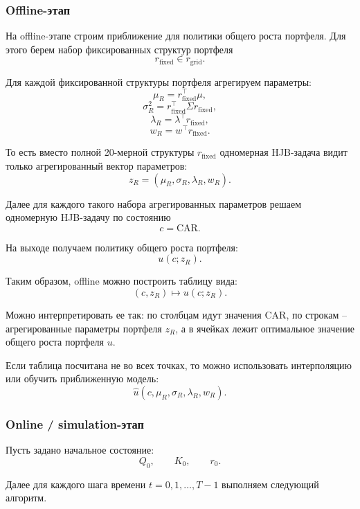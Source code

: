 \documentclass[12pt,a4paper]{article}
\begin{document}
\subsubsection*{Offline-этап}

На offline-этапе строим приближение для политики общего роста портфеля. Для этого берем набор фиксированных структур портфеля
\[
    r_{\mathrm{fixed}} \in r_{\mathrm{grid}}.
\]

Для каждой фиксированной структуры портфеля агрегируем параметры:
\[
    \mu_R = r_{\mathrm{fixed}}^\top \mu,
\]
\[
    \sigma_R^2 = r_{\mathrm{fixed}}^\top \Sigma r_{\mathrm{fixed}},
\]
\[
    \lambda_R = \lambda^\top r_{\mathrm{fixed}},
\]
\[
    w_R = w^\top r_{\mathrm{fixed}}.
\]

То есть вместо полной 20-мерной структуры $r_{\mathrm{fixed}}$ одномерная HJB-задача видит только агрегированный вектор параметров:
\[
    z_R =
    (\mu_R,\sigma_R,\lambda_R,w_R).
\]

Далее для каждого такого набора агрегированных параметров решаем одномерную HJB-задачу по состоянию
\[
    c = \mathrm{CAR}.
\]

На выходе получаем политику общего роста портфеля:
\[
    u(c; z_R).
\]

Таким образом, offline можно построить таблицу вида:
\[
    (c,z_R) \mapsto u(c;z_R).
\]

Можно интерпретировать ее так: по столбцам идут значения CAR, по строкам -- агрегированные параметры портфеля $z_R$, а в ячейках лежит оптимальное значение общего роста портфеля $u$.

Если таблица посчитана не во всех точках, то можно использовать интерполяцию или обучить приближенную модель:
\[
    \widehat u(c,\mu_R,\sigma_R,\lambda_R,w_R).
\]

\subsubsection*{Online / simulation-этап}

Пусть задано начальное состояние:
\[
    Q_0,\qquad K_0,\qquad r_0.
\]

Далее для каждого шага времени $t=0,1,\dots,T-1$ выполняем следующий алгоритм.
\end{document}
